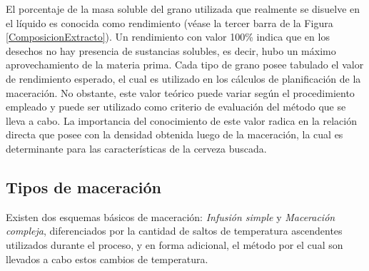             \par El porcentaje de la masa soluble del grano utilizada que realmente se disuelve en el líquido es conocida como rendimiento (véase la tercer barra de la Figura \ref{ComposicionExtracto}). Un rendimiento con valor 100\% indica que en los desechos no hay presencia de sustancias solubles, es decir, hubo un máximo aprovechamiento de la materia prima. Cada tipo de grano posee tabulado el valor de rendimiento esperado, el cual es utilizado en los cálculos de planificación de la maceración. No obstante, este valor teórico puede variar según el procedimiento empleado y puede ser utilizado como criterio de evaluación del método que se lleva a cabo. La importancia del conocimiento de este valor radica en la relación directa que posee con la densidad obtenida luego de la maceración, la cual es determinante para las características de la cerveza buscada. 
            
        \subsection{Tipos de maceración}
            \par Existen dos esquemas básicos de maceración: \textit{Infusión simple} y \textit{Maceración compleja}, diferenciados por la cantidad de saltos de temperatura ascendentes utilizados durante el proceso, y en forma adicional, el método por el cual son llevados a cabo estos cambios de temperatura.
            
